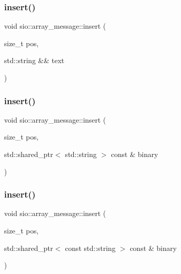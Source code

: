 \subsubsection{\texorpdfstring{insert()}{insert()}\hspace{0.1cm}{\footnotesize\ttfamily [3/5]}}
{\footnotesize\ttfamily void sio\+::array\+\_\+message\+::insert (\begin{DoxyParamCaption}\item[{size\+\_\+t}]{pos,  }\item[{std\+::string \&\&}]{text }\end{DoxyParamCaption})\hspace{0.3cm}{\ttfamily [inline]}}

\mbox{\label{classsio_1_1array__message_ac84632e5968cc80be47314a00c17af0c}} 
\subsubsection{\texorpdfstring{insert()}{insert()}\hspace{0.1cm}{\footnotesize\ttfamily [4/5]}}
{\footnotesize\ttfamily void sio\+::array\+\_\+message\+::insert (\begin{DoxyParamCaption}\item[{size\+\_\+t}]{pos,  }\item[{std\+::shared\+\_\+ptr$<$ std\+::string $>$ const \&}]{binary }\end{DoxyParamCaption})\hspace{0.3cm}{\ttfamily [inline]}}

\mbox{\label{classsio_1_1array__message_ae154a195d738a3dec30a78865598ce89}} 
\subsubsection{\texorpdfstring{insert()}{insert()}\hspace{0.1cm}{\footnotesize\ttfamily [5/5]}}
{\footnotesize\ttfamily void sio\+::array\+\_\+message\+::insert (\begin{DoxyParamCaption}\item[{size\+\_\+t}]{pos,  }\item[{std\+::shared\+\_\+ptr$<$ const std\+::string $>$ const \&}]{binary }\end{DoxyParamCaption})\hspace{0.3cm}{\ttfamily [inline]}}

